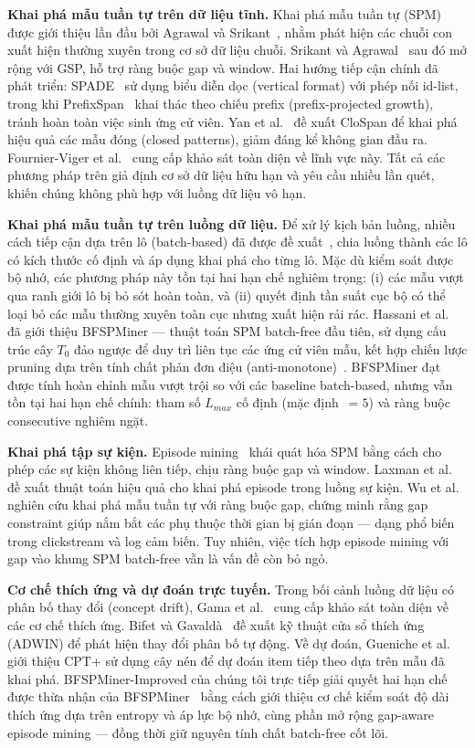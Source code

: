\documentclass[conference]{IEEEtran}
\begin{document}
\textbf{Khai phá mẫu tuần tự trên dữ liệu tĩnh.} Khai phá mẫu tuần tự (SPM) được giới thiệu lần đầu bởi Agrawal và Srikant~\cite{agrawal1995}, nhằm phát hiện các chuỗi con xuất hiện thường xuyên trong cơ sở dữ liệu chuỗi. Srikant và Agrawal~\cite{srikant1996} sau đó mở rộng với GSP, hỗ trợ ràng buộc gap và window. Hai hướng tiếp cận chính đã phát triển: SPADE~\cite{zaki2001} sử dụng biểu diễn dọc (vertical format) với phép nối id-list, trong khi PrefixSpan~\cite{pei2001} khai thác theo chiếu prefix (prefix-projected growth), tránh hoàn toàn việc sinh ứng cử viên. Yan et al.~\cite{yan2003} đề xuất CloSpan để khai phá hiệu quả các mẫu đóng (closed patterns), giảm đáng kể không gian đầu ra. Fournier-Viger et al.~\cite{fournier2017} cung cấp khảo sát toàn diện về lĩnh vực này. Tất cả các phương pháp trên giả định cơ sở dữ liệu hữu hạn và yêu cầu nhiều lần quét, khiến chúng không phù hợp với luồng dữ liệu vô hạn.

\textbf{Khai phá mẫu tuần tự trên luồng dữ liệu.} Để xử lý kịch bản luồng, nhiều cách tiếp cận dựa trên lô (batch-based) đã được đề xuất~\cite{marascu2006, ho2005}, chia luồng thành các lô có kích thước cố định và áp dụng khai phá cho từng lô. Mặc dù kiểm soát được bộ nhớ, các phương pháp này tồn tại hai hạn chế nghiêm trọng: (i) các mẫu vượt qua ranh giới lô bị bỏ sót hoàn toàn, và (ii) quyết định tần suất cục bộ có thể loại bỏ các mẫu thường xuyên toàn cục nhưng xuất hiện rải rác. Hassani et al.~\cite{hassani2019} đã giới thiệu BFSPMiner --- thuật toán SPM batch-free đầu tiên, sử dụng cấu trúc cây $T_0$ đảo ngược để duy trì liên tục các ứng cử viên mẫu, kết hợp chiến lược pruning dựa trên tính chất phản đơn điệu (anti-monotone)~\cite{agrawal1994}. BFSPMiner đạt được tính hoàn chỉnh mẫu vượt trội so với các baseline batch-based, nhưng vẫn tồn tại hai hạn chế chính: tham số $L_{max}$ cố định (mặc định~$= 5$) và ràng buộc consecutive nghiêm ngặt.

\textbf{Khai phá tập sự kiện.} Episode mining~\cite{mannila1997} khái quát hóa SPM bằng cách cho phép các sự kiện không liên tiếp, chịu ràng buộc gap và window. Laxman et al.~\cite{laxman2007} đề xuất thuật toán hiệu quả cho khai phá episode trong luồng sự kiện. Wu et al.~\cite{wu2013} nghiên cứu khai phá mẫu tuần tự với ràng buộc gap, chứng minh rằng gap constraint giúp nắm bắt các phụ thuộc thời gian bị gián đoạn --- dạng phổ biến trong clickstream và log cảm biến. Tuy nhiên, việc tích hợp episode mining với gap vào khung SPM batch-free vẫn là vấn đề còn bỏ ngỏ.

\textbf{Cơ chế thích ứng và dự đoán trực tuyến.} Trong bối cảnh luồng dữ liệu có phân bố thay đổi (concept drift), Gama et al.~\cite{gama2014} cung cấp khảo sát toàn diện về các cơ chế thích ứng. Bifet và Gavald\`{a}~\cite{bifet2007} đề xuất kỹ thuật cửa sổ thích ứng (ADWIN) để phát hiện thay đổi phân bố tự động. Về dự đoán, Gueniche et al.~\cite{gueniche2013} giới thiệu CPT+ sử dụng cây nén để dự đoán item tiếp theo dựa trên mẫu đã khai phá. BFSPMiner-Improved của chúng tôi trực tiếp giải quyết hai hạn chế được thừa nhận của BFSPMiner~\cite{hassani2019} bằng cách giới thiệu cơ chế kiểm soát độ dài thích ứng dựa trên entropy và áp lực bộ nhớ, cùng phần mở rộng gap-aware episode mining --- đồng thời giữ nguyên tính chất batch-free cốt lõi.
\end{document}
